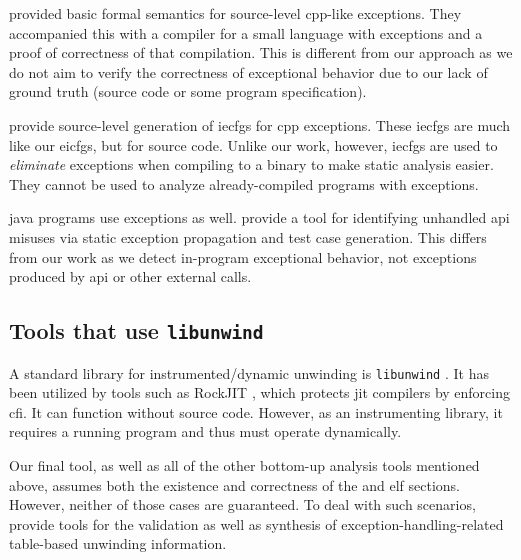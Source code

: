 \Textcite{hutton2004compiling} provided basic formal semantics for source-level \gls{cpp}-like exceptions.
They accompanied this with a compiler for a small language with exceptions and a proof of correctness of that compilation.
This is different from our approach as we do not aim to verify the correctness of exceptional behavior due to our lack of ground truth (source code or some program specification).

\Textcite{prabhu2011interprocedural} provide source-level generation of \glspl{iecfg} for \gls{cpp} exceptions.
These \glspl{iecfg} are much like our \glspl{eicfg}, but for source code.
Unlike our work, however, \glspl{iecfg} are used to \emph{eliminate} exceptions when compiling to a binary to make static analysis easier.
They cannot be used to analyze already-compiled programs with exceptions.

\Gls{java} programs use exceptions as well. \Textcite{kechagia2019misuse} provide a tool for identifying unhandled \gls{api} misuses via static exception propagation and test case generation. This differs from our work as we detect in-program exceptional behavior, not exceptions produced by \gls{api} or other external calls.

\subsection{Tools that use \texttt{libunwind}}
A standard library for instrumented/dynamic unwinding is \lstinline|libunwind| \autocite{libunwind}.
It has been utilized by tools such as RockJIT \autocite{niu2014rockjit}, which protects \gls{jit} compilers by enforcing \gls{cfi}.
It can function without source code. However, as an instrumenting library, it requires a running program and thus must operate dynamically.

Our final tool, as well as all of the other bottom-up analysis tools mentioned above, assumes both the existence and correctness of the  and  \gls{elf} sections.
However, neither of those cases are guaranteed.
To deal with such scenarios, \textcite{bastian2019dwarf} provide tools for the validation as well as synthesis of exception-handling-related table-based unwinding information.

%
%
%
%

